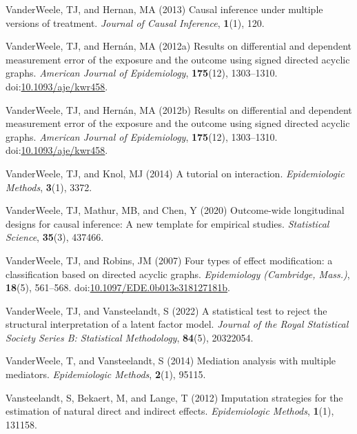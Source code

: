 \documentclass[
  singlecolumn]{article}
\newlength{\cslhangindent}
\newenvironment{CSLReferences}[2] %
 {\begin{list}{}{%
  \setlength{\itemindent}{0pt}
  \setlength{\leftmargin}{0pt}
  \setlength{\parsep}{0pt}
  \ifodd #1
   \setlength{\leftmargin}{\cslhangindent}
   \setlength{\itemindent}{-1\cslhangindent}
  \fi
  \setlength{\itemsep}{#2\baselineskip}}}
 {\end{list}}
\begin{document}
\begin{CSLReferences}{1}{0}
VanderWeele, TJ, and Hernan, MA (2013) Causal inference under multiple
versions of treatment. \emph{Journal of Causal Inference},
\textbf{1}(1), 120.

VanderWeele, TJ, and Hernán, MA (2012a) Results on differential and
dependent measurement error of the exposure and the outcome using signed
directed acyclic graphs. \emph{American Journal of Epidemiology},
\textbf{175}(12), 1303--1310.
doi:\href{https://doi.org/10.1093/aje/kwr458}{10.1093/aje/kwr458}.

VanderWeele, TJ, and Hernán, MA (2012b) Results on differential and
dependent measurement error of the exposure and the outcome using signed
directed acyclic graphs. \emph{American Journal of Epidemiology},
\textbf{175}(12), 1303--1310.
doi:\href{https://doi.org/10.1093/aje/kwr458}{10.1093/aje/kwr458}.

VanderWeele, TJ, and Knol, MJ (2014) A tutorial on interaction.
\emph{Epidemiologic Methods}, \textbf{3}(1), 3372.

VanderWeele, TJ, Mathur, MB, and Chen, Y (2020) Outcome-wide
longitudinal designs for causal inference: A new template for empirical
studies. \emph{Statistical Science}, \textbf{35}(3), 437466.

VanderWeele, TJ, and Robins, JM (2007) Four types of effect
modification: a classification based on directed acyclic graphs.
\emph{Epidemiology (Cambridge, Mass.)}, \textbf{18}(5), 561--568.
doi:\href{https://doi.org/10.1097/EDE.0b013e318127181b}{10.1097/EDE.0b013e318127181b}.

VanderWeele, TJ, and Vansteelandt, S (2022) A statistical test to reject
the structural interpretation of a latent factor model. \emph{Journal of
the Royal Statistical Society Series B: Statistical Methodology},
\textbf{84}(5), 20322054.

VanderWeele, T, and Vansteelandt, S (2014) Mediation analysis with
multiple mediators. \emph{Epidemiologic Methods}, \textbf{2}(1), 95115.

Vansteelandt, S, Bekaert, M, and Lange, T (2012) Imputation strategies
for the estimation of natural direct and indirect effects.
\emph{Epidemiologic Methods}, \textbf{1}(1), 131158.


\end{CSLReferences}
\end{document}
